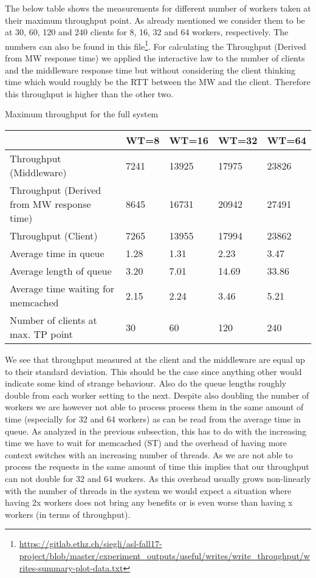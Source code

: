 \documentclass[11pt,a4paper]{article}
\begin{document}
The below table shows the measurements for different number of workers taken at their maximum throughput point. As already mentioned we consider them to be at 30, 60, 120 and 240 clients for 8, 16, 32 and 64 workers, respectively. The numbers can also be found in this file\footnote{\url{https://gitlab.ethz.ch/siegli/asl-fall17-project/blob/master/experiment_outputs/useful/writes/write_throughput/writes-summary-plot-data.txt}}. For calculating the Throughput (Derived from MW response time) we applied the interactive law to the number of clients and the middleware response time but without considering the client thinking time which would roughly be the RTT between the MW and the client. Therefore this throughput is higher than the other two.
\begin{center}
	{Maximum throughput for the full system}
	\begin{tabular}{|l|p{1.5cm}|p{1.5cm}|p{1.5cm}|p{1.5cm}|}
		\hline                                            & WT=8 & WT=16 & WT=32 & WT=64 \\ 
		\hline Throughput (Middleware)                    & 7241 & 13925 & 17975 &  23826     \\ 
		\hline Throughput (Derived from MW response time) & 8645 & 16731 & 20942 &  27491     \\ 
		\hline Throughput (Client)                        & 7265 & 13955 & 17994 &  23862     \\ 
		\hline Average time in queue                      & 1.28 &  1.31 &  2.23 & 3.47      \\ 
		\hline Average length of queue                    & 3.20 &  7.01 &  14.69& 33.86      \\ 
		\hline Average time waiting for memcached         & 2.15 &  2.24 &  3.46 &  5.21     \\ 
		\hline Number of clients at max. TP point         &  30  &    60 &  120  & 240   \\
		\hline 
	\end{tabular}
\end{center}

We see that throughput measured at the client and the middleware are equal up to their standard deviation. This should be the case since anything other would indicate some kind of strange behaviour. Also do the queue lengths roughly double from each worker setting to the next. Despite also doubling the number of workers we are however not able to process process them in the same amount of time (especially for 32 and 64 workers) as can be read from the average time in queue. As analyzed in the previous subsection, this has to do with the increasing time we have to wait for memcached (ST) and the overhead of having more context switches with an increasing number of threads. As we are not able to process the requests in the same amount of time this implies that our throughput can not double for 32 and 64 workers. As this overhead usually grows non-linearly with the number of threads in the system we would expect a situation where having 2x workers does not bring any benefits or is even worse than having x workers (in terms of throughput).  
\end{document}
